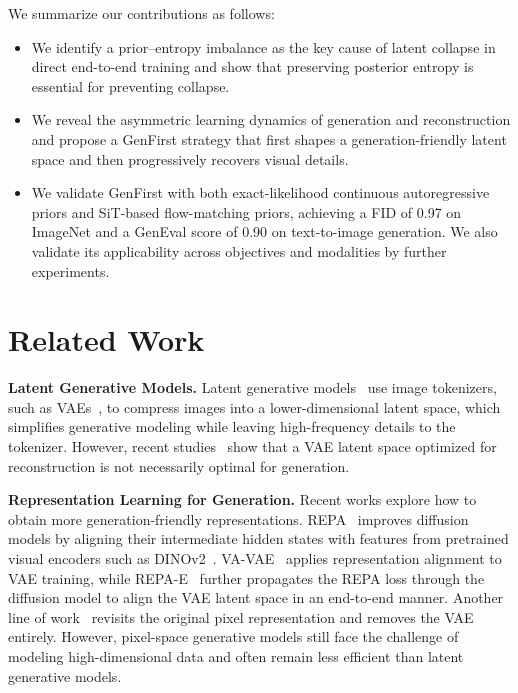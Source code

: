 \documentclass[]{bytedance_seed}
\begin{document}
We summarize our contributions as follows:
\begin{itemize}
    \item We identify a prior--entropy imbalance as the key cause of latent collapse in direct end-to-end training and show that preserving posterior entropy is essential for preventing collapse.
    \item 
    We reveal the asymmetric learning dynamics of generation and reconstruction and 
    propose a GenFirst strategy that first shapes a generation-friendly latent space and then progressively recovers visual details.
    \item We validate GenFirst with both exact-likelihood continuous autoregressive priors and SiT-based flow-matching priors, achieving a FID of 0.97 on ImageNet and a GenEval score of 0.90 on text-to-image generation. We also validate its applicability across objectives and modalities by further experiments.
\end{itemize}

\section{Related Work}

\textbf{Latent Generative Models.}
Latent generative models~\cite{ldm,uvit,maskdit,dit,sit,llamagen,mar,var,himar,starflow} use image tokenizers, such as VAEs~\cite{ldm,vavae}, to compress images into a lower-dimensional latent space, which simplifies generative modeling while leaving high-frequency details to the tokenizer. 
However, recent studies~\cite{repa,vavae,repa_e} show that a VAE latent space optimized for reconstruction is not necessarily optimal for generation.

\textbf{Representation Learning for Generation.}
Recent works explore how to obtain more generation-friendly representations.
REPA~\cite{repa} improves diffusion models by aligning their intermediate hidden states with features from pretrained visual encoders such as DINOv2~\cite{dino}. 
VA-VAE~\cite{vavae} applies representation alignment to VAE training, while REPA-E~\cite{repa_e} further propagates the REPA loss through the diffusion model to align the VAE latent space in an end-to-end manner. 
Another line of work~\cite{tarflow,wang2025pixnerd,zheng2025farmer,jit,pixeldit,deco} revisits the original pixel representation and removes the VAE entirely. 
However, pixel-space generative models still face the challenge of modeling high-dimensional data and often remain less efficient than latent generative models.
\end{document}
